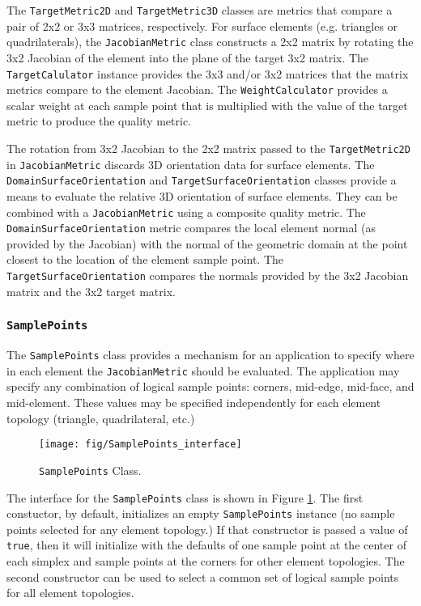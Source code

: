 \documentclass{article}
\begin{document}
The \texttt{TargetMetric2D} and \texttt{TargetMetric3D} classes are metrics that compare a pair of 2x2 or 3x3 matrices, respectively.  For surface elements (e.g. triangles or quadrilaterals), the \texttt{JacobianMetric} class constructs a 2x2 matrix by rotating the 3x2 Jacobian of the element into the plane of the target 3x2 matrix.  The \texttt{TargetCalulator} instance provides the 3x3 and/or 3x2 matrices that the matrix metrics compare to the element Jacobian.  The \texttt{WeightCalculator} provides a scalar weight at each sample point that is multiplied with the value of the target metric to produce the quality metric.

The rotation from 3x2 Jacobian to the 2x2 matrix passed to the \texttt{TargetMetric2D} in \texttt{JacobianMetric} discards 3D orientation data for surface elements.  The \texttt{DomainSurfaceOrientation} and \texttt{TargetSurfaceOrientation} classes provide a means to evaluate the relative 3D orientation of surface elements.  They can be combined with a \texttt{JacobianMetric} using a composite quality metric.  The \texttt{DomainSurfaceOrientation} metric compares the local element normal (as provided by the Jacobian) with the normal of the geometric domain at the point closest to the location of the element sample point.  The \texttt{TargetSurfaceOrientation} compares the normals provided by the 3x2 Jacobian matrix and the 3x2 target matrix.

\subsubsection{\texttt{SamplePoints}}
The \texttt{SamplePoints} class provides a mechanism for an application to specify where in each element the \texttt{JacobianMetric} should be evaluated.  The application may specify any combination of logical sample points: corners, mid-edge, mid-face, and mid-element.  These values may be specified independently for each element topology (triangle, quadrilateral, etc.)  

\begin{figure}[htb]
\begin{center}
\texttt{[image: fig/SamplePoints\_interface]}
\caption{\texttt{SamplePoints} Class.\label{fig:SamplePoints}}
\end{center}
\end{figure}

The interface for the \texttt{SamplePoints} class is shown in Figure \ref{fig:SamplePoints}.  The first constuctor, by default, initializes an empty \texttt{SamplePoints} instance (no sample points selected for any element topology.)  If that constructor is passed a value of \texttt{true}, then it will initialize with the defaults of one sample point at the center of each simplex and sample points at the corners for other element topologies.  The second constructor can be used to select a common set of logical sample points for all element topologies.  
\end{document}
